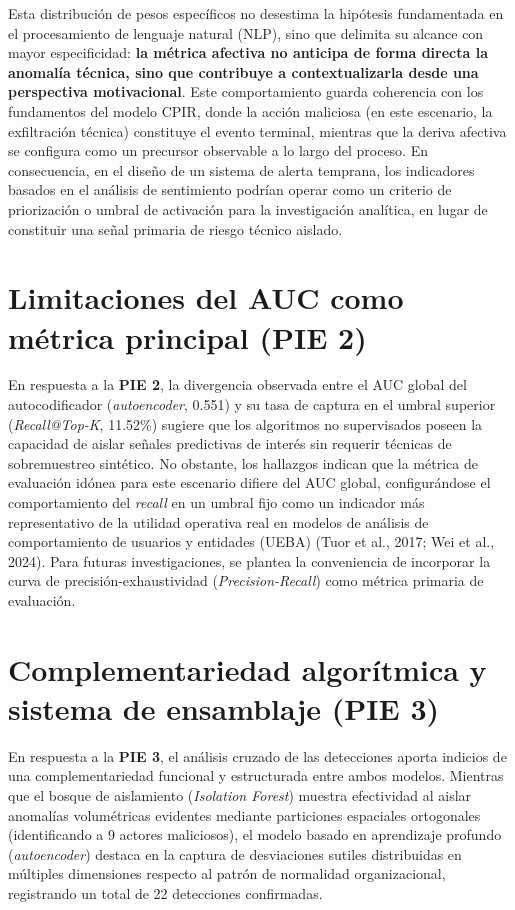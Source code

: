 \documentclass[IB]{TFUOC}%
\begin{document}
\medskip
\noindent Esta distribución de pesos específicos no desestima la hipótesis fundamentada en el procesamiento de lenguaje natural (NLP), sino que delimita su alcance con mayor especificidad: \textbf{la métrica afectiva no anticipa de forma directa la anomalía técnica, sino que contribuye a contextualizarla desde una perspectiva motivacional}. Este comportamiento guarda coherencia con los fundamentos del modelo CPIR, donde la acción maliciosa (en este escenario, la exfiltración técnica) constituye el evento terminal, mientras que la deriva afectiva se configura como un precursor observable a lo largo del proceso. En consecuencia, en el diseño de un sistema de alerta temprana, los indicadores basados en el análisis de sentimiento podrían operar como un criterio de priorización o umbral de activación para la investigación analítica, en lugar de constituir una señal primaria de riesgo técnico aislado.

\section{Limitaciones del AUC como métrica principal (PIE 2)}
En respuesta a la \textbf{PIE 2}, la divergencia observada entre el AUC global del autocodificador (\textit{autoencoder}, 0.551) y su tasa de captura en el umbral superior (\textit{Recall@Top-K}, 11.52\%) sugiere que los algoritmos no supervisados poseen la capacidad de aislar señales predictivas de interés sin requerir técnicas de sobremuestreo sintético. No obstante, los hallazgos indican que la métrica de evaluación idónea para este escenario difiere del AUC global, configurándose el comportamiento del \textit{recall} en un umbral fijo como un indicador más representativo de la utilidad operativa real en modelos de análisis de comportamiento de usuarios y entidades (UEBA) (Tuor et al., 2017; Wei et al., 2024). Para futuras investigaciones, se plantea la conveniencia de incorporar la curva de precisión-exhaustividad (\textit{Precision-Recall}) como métrica primaria de evaluación.

\section{Complementariedad algorítmica y sistema de ensamblaje (PIE 3)}
En respuesta a la \textbf{PIE 3}, el análisis cruzado de las detecciones aporta indicios de una complementariedad funcional y estructurada entre ambos modelos. Mientras que el bosque de aislamiento (\textit{Isolation Forest}) muestra efectividad al aislar anomalías volumétricas evidentes mediante particiones espaciales ortogonales (identificando a 9 actores maliciosos), el modelo basado en aprendizaje profundo (\textit{autoencoder}) destaca en la captura de desviaciones sutiles distribuidas en múltiples dimensiones respecto al patrón de normalidad organizacional, registrando un total de 22 detecciones confirmadas.
\end{document}
